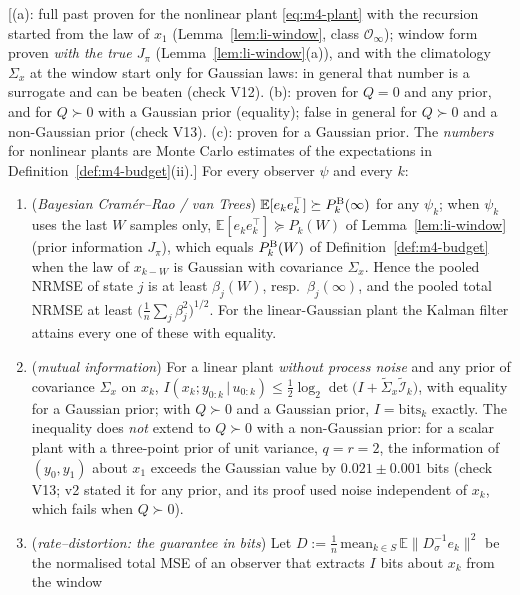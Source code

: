 \begin{theorem}\label{thm:m4-bounds}
 [(a): full past proven for the nonlinear plant \eqref{eq:m4-plant} with the recursion started
from the law of $x_1$ (Lemma~\ref{lem:li-window}, class $\mathcal O_\infty$); window form proven \emph{with the true $J_\pi$}
(Lemma~\ref{lem:li-window}(a)), and with the climatology $\Sigma_x$ at the window start only for Gaussian laws: in
general that number is a surrogate and can be beaten (check V12). (b): proven for $Q=0$ and any prior, and for
$Q\succ0$ with a Gaussian prior (equality); false in general for $Q\succ0$ and a non-Gaussian prior (check V13). (c):
proven for a Gaussian prior. The \emph{numbers} for nonlinear plants are Monte Carlo estimates of the expectations in
Definition~\ref{def:m4-budget}(ii).]
For every observer $\psi$ and every $k$:
\begin{enumerate}
\item[(a)] (\emph{Bayesian Cram\'er--Rao / van Trees}) $\mathbb E[e_ke_k^\top]\succeq P^{\rm B}_k(\infty)$ for any $\psi_k$; when
$\psi_k$ uses the last $W$ samples only, $\mathbb E[e_ke_k^\top]\succeq P_k(W)$ of Lemma~\ref{lem:li-window} (prior information $J_\pi$),
which equals $P^{\rm B}_k(W)$ of Definition~\ref{def:m4-budget} when the law of $x_{k-W}$ is Gaussian with covariance $\Sigma_x$. Hence the pooled
NRMSE of state $j$ is at least $\beta_j(W)$, resp.\ $\beta_j(\infty)$, and the pooled total NRMSE at least
$\big(\tfrac1n\sum_j\beta_j^2\big)^{1/2}$. For the linear-Gaussian plant the Kalman filter attains every one of
these with equality.
\item[(b)] (\emph{mutual information}) For a linear plant \emph{without process noise} and any prior of covariance $\Sigma_x$
on $x_k$, $I(x_k;y_{0:k}\,|\,u_{0:k})\le\tfrac12\log_2\det\big(I+\tilde\Sigma_x\tilde{\mathcal I}_k\big)$, with equality for a
Gaussian prior; with $Q\succ0$ and a Gaussian prior, $I=\mathrm{bits}_k$ exactly. The inequality does \emph{not} extend
to $Q\succ0$ with a non-Gaussian prior: for a scalar plant with a three-point prior of unit variance, $q=r=2$, the
information of $(y_0,y_1)$ about $x_1$ exceeds the Gaussian value by $0.021\pm0.001$ bits (check V13; v2 stated it
for any prior, and its proof used noise independent of $x_k$, which fails when $Q\succ0$).
\item[(c)] (\emph{rate--distortion: the guarantee in bits}) Let $D:=\tfrac1n\,\mathrm{mean}_{k\in S}\,\mathbb E\|D_\sigma^{-1}e_k\|^2$
be the normalised total MSE of an observer that extracts $I$ bits about $x_k$ from the window

\end{enumerate}
\end{theorem}
